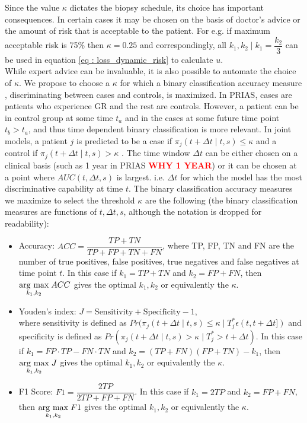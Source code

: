 Since the value $\kappa$ dictates the biopsy schedule, its choice has important consequences. In certain cases it may be chosen on the basis of doctor's advice or the amount of risk that is acceptable to the patient. For e.g. if maximum acceptable risk is 75\% then $\kappa = 0.25$ and correspondingly, all $k_1, k_2 \mid k_1=\dfrac{k_2}{3}$ can be used in equation \ref{eq : loss_dynamic_risk} to calculate $u$. \\

While expert advice can be invaluable, it is also possible to automate the choice of $\kappa$. We propose to choose a $\kappa$ for which a binary classification accuracy measure \citep{lopez2014optimalcutpoints,sokolova2009systematic}, discriminating between cases and controls, is maximized. In PRIAS, cases are patients who experience GR and the rest are controls. However, a patient can be in control group at some time $t_a$ and in the cases at some future time point $t_b > t_a$, and thus time dependent binary classification is more relevant. In joint models, a patient $j$ is predicted to be a case if $\pi_j(t + \Delta t \mid t,s) \leq \kappa$ and a control if $\pi_j(t + \Delta t \mid t,s) > \kappa$ \citep{rizopoulosJMbayes}. The time window $\Delta t$ can be either chosen on a clinical basis (such as 1 year in PRIAS \textcolor{red}{\textbf{WHY 1 YEAR}}) or it can be chosen at a point where $AUC(t, \Delta t, s)$ \citep{rizopoulosJMbayes} is largest. i.e. $\Delta t$ for which the model has the most discriminative capability at time $t$. The binary classification accuracy measures we maximize to select the threshold $\kappa$ are the following (the binary classification measures are functions of $t, \Delta t, s$, although the notation is dropped for readability): 

\begin{itemize}
\item Accuracy: $ACC = \dfrac{TP + TN}{TP + FP + TN + FN}$, where TP, FP, TN and FN are the number of true positives, false positives, true negatives and false negatives at time point $t$. In this case if $k_1 = TP + TN$ and $k_2 = FP + FN$, then $\underset{k_1, k_2}{\operatorname{arg}\,\operatorname{max}}\; ACC$ gives the optimal $k_1, k_2$ or equivalently the $\kappa$.

\item Youden's index: $J = \text{Sensitivity} + \text{Specificity}- 1$,\\
where sensitivity is defined as $Pr(\pi_j(t + \Delta t \mid t,s) \leq \kappa \mid T^*_j \epsilon (t, t + \Delta t])$ and specificity is defined as $Pr(\pi_j(t + \Delta t \mid t,s) > \kappa \mid T^*_j > t + \Delta t)$. In this case if $k_1 = FP \cdot TP - FN \cdot TN$ and $k_2 = (TP+FN)(FP+TN) - k_1$, then $\underset{k_1, k_2}{\operatorname{arg}\,\operatorname{max}}\; J$ gives the optimal $k_1, k_2$ or equivalently the $\kappa$.

\item F1 Score: $F1 = \dfrac{2TP}{2TP + FP + FN}$. In this case if $k_1 = 2TP$ and $k_2 = FP + FN$, then $\underset{k_1, k_2}{\operatorname{arg}\,\operatorname{max}}\; F1$ gives the optimal $k_1, k_2$ or equivalently the $\kappa$.
\end{itemize}

